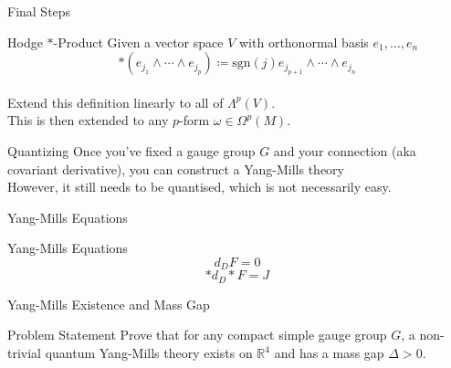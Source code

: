 \documentclass{beamer}
\newcommand{\Real}{\mathbb{R}}
\begin{document}
  \begin{frame}{Final Steps}
      \pause
      \begin{block}{Hodge $*$-Product}
          Given a vector space $V$ with orthonormal basis ${e_1, \ldots, e_n}$
          $$*(e_{j_1} \wedge \cdots \wedge e_{j_p}) \coloneqq \mathrm{sgn}(j)
          e_{j_{p+1}} \wedge \cdots \wedge e_{j_n}$$ \pause \\
          Extend this definition linearly to all of $\Lambda^p(V)$. \pause \\
          This is then extended to any $p$-form $\omega \in \Omega^p(M)$.
      \end{block}
      \pause
      \begin{block}{Quantizing}
          Once you've fixed a gauge group $G$ and your connection (aka
          covariant derivative), you can construct a Yang-Mills theory\pause\\
          However, it still needs to be quantised, which is not necessarily
          easy.
      \end{block}
  \end{frame}
  \begin{frame}{Yang-Mills Equations}
      \pause
      \begin{block}{Yang-Mills Equations}
          $$d_D F = 0$$
          $$*d_D * F = J$$
      \end{block}
  \end{frame}
  \begin{frame}{Yang-Mills Existence and Mass Gap}
      \begin{block}{Problem Statement}
          Prove that for any compact simple gauge group $G$, a non-trivial
          quantum Yang-Mills theory exists on $\Real^4$ and has a mass gap
          $\Delta > 0$.
      \end{block}
  \end{frame}
\end{document}

